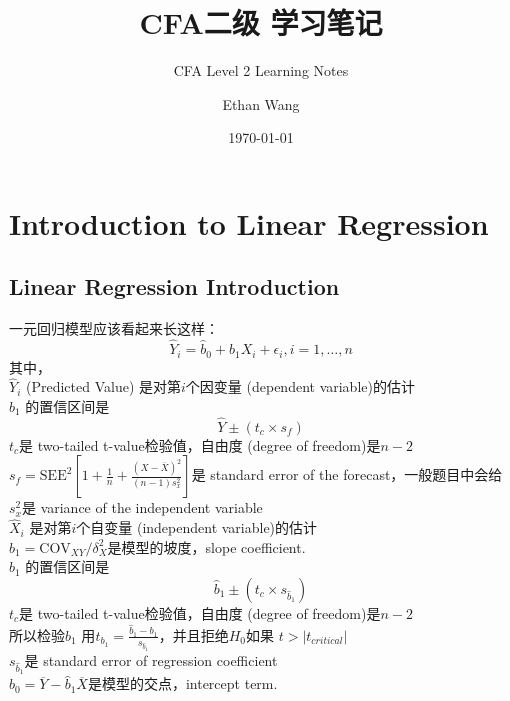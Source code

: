 \documentclass[cn,11pt,chinese]{elegantbook}
\title{CFA二级 学习笔记}
\subtitle{CFA Level 2 Learning Notes}
\author{Ethan Wang}
\institute{纽约大学}
\date{\today}
\begin{document}
\maketitle
\frontmatter

\tableofcontents

\mainmatter 

\chapter{Introduction to Linear Regression}

\section{Linear Regression Introduction}
    一元回归模型应该看起来长这样：
    \begin{equation}
        \hat Y_i = \hat b_0 + \hat b_1 X_i + \epsilon_i, i = 1,\dots, n
    \end{equation}
    其中，\\
    \indent \(\hat Y_i\) (Predicted Value) 是对第\(i\)个因变量 (dependent variable)的估计\\
    \indent \indent \(\hat b_1\) 的置信区间是
        \[\hat Y \pm (t_c \times s_f)\]
    \indent \indent \indent \(t_c\)是 two-tailed t-value检验值，自由度 (degree of freedom)是\(n - 2\)\\ 
    \indent \indent \indent \(s_f = \text{SEE}^2 [1 + \frac{1}{n} + \frac{(X - \overline{X})^2}{(n - 1)s_x^2}]\)是 standard error of the forecast，一般题目中会给\\ 
    \indent \indent \indent \indent \(s_x^2\)是 variance of the independent variable\\
    \indent \(\hat X_i\) 是对第\(i\)个自变量 (independent variable)的估计\\
    \indent \(\hat b_1 = \text{COV}_{XY} / \delta_X^2\)是模型的坡度，slope coefficient.\\
    \indent \indent \(\hat b_1\) 的置信区间是
        \[ \hat b_1 \pm (t_c \times s_{\hat b_1}) \] 
    \indent \indent \indent \(t_c\)是 two-tailed t-value检验值，自由度 (degree of freedom)是\(n - 2\)\\ 
    \indent \indent \indent \indent 所以检验\(\hat b_1\) 用\(t_{b_1} = \frac{\hat b_1 - b_1}{s_{\hat b_1}}\)，并且拒绝\(H_0\)如果 \(t > |t_{critical}|\)\\ 
    \indent \indent \indent \(s_{\hat b_1}\)是 standard error of regression coefficient\\
    \indent \(\hat b_0 = \overline{Y} - \hat b_1 \overline{X}\)是模型的交点，intercept term.
\end{document}
